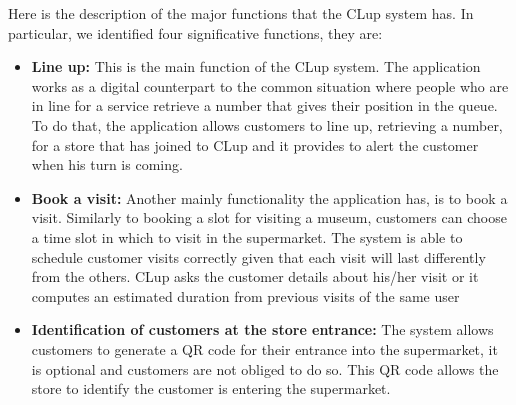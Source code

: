 Here is the description of the major functions that the CLup system has. In particular, we identified four significative functions, they are:
\begin{itemize}
    \item \textbf{Line up:} This is the main function of the CLup system. The application works as a digital counterpart to the common situation where people who are in line for a service retrieve a number that gives their position in the queue. \newline To do that, the application allows customers to line up, retrieving a number, for a store that has joined to CLup and it provides to alert the customer when his turn is coming.
    \item \textbf{Book a visit:} Another mainly functionality the application has, is to book a visit. Similarly to booking a slot for visiting a museum, customers can choose a time slot in which to visit in the supermarket. The system is able to schedule customer visits correctly given that each visit will last differently from the others. CLup asks the customer details about his/her visit or it computes an estimated duration from previous visits of the same user
    \item \textbf{Identification of customers at the store entrance:} The system allows customers to generate a QR code for their entrance into the supermarket, it is optional and customers are not obliged to do so. This QR code allows the store to identify the customer is entering the supermarket.
\end{itemize}